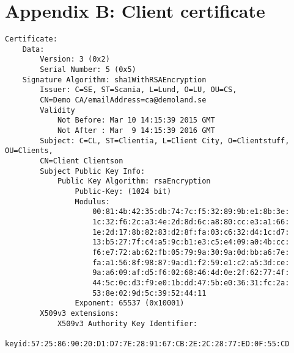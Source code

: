\documentclass[11pt,a4paper]{article}
\begin{document}
\section{Appendix B: Client certificate}
\begin{verbatim}
Certificate:
    Data:
        Version: 3 (0x2)
        Serial Number: 5 (0x5)
    Signature Algorithm: sha1WithRSAEncryption
        Issuer: C=SE, ST=Scania, L=Lund, O=LU, OU=CS,
        CN=Demo CA/emailAddress=ca@demoland.se
        Validity
            Not Before: Mar 10 14:15:39 2015 GMT
            Not After : Mar  9 14:15:39 2016 GMT
        Subject: C=CL, ST=Clientia, L=Client City, O=Clientstuff, OU=Clients,
        CN=Client Clientson
        Subject Public Key Info:
            Public Key Algorithm: rsaEncryption
                Public-Key: (1024 bit)
                Modulus:
                    00:81:4b:42:35:db:74:7c:f5:32:89:9b:e1:8b:3e:
                    1c:32:f6:2c:a3:4e:2d:8d:6c:a8:80:cc:e3:a1:66:
                    1e:2d:17:8b:82:83:d2:8f:fa:03:c6:32:d4:1c:d7:
                    13:b5:27:7f:c4:a5:9c:b1:e3:c5:e4:09:a0:4b:cc:
                    f6:e7:72:ab:62:fb:05:79:9a:30:9a:0d:bb:a6:7e:
                    fa:a1:56:8f:98:87:9a:d1:f2:59:e1:c2:a5:3d:ce:
                    9a:a6:09:af:d5:f6:02:68:46:4d:0e:2f:62:77:4f:
                    44:5c:0c:d3:f9:e0:1b:dd:47:5b:e0:36:31:fc:2a:
                    53:8e:02:9d:5c:39:52:44:11
                Exponent: 65537 (0x10001)
        X509v3 extensions:
            X509v3 Authority Key Identifier: 
                keyid:57:25:86:90:20:D1:D7:7E:28:91:67:CB:2E:2C:28:77:ED:0F:55:CD


\end{verbatim}
\end{document}
